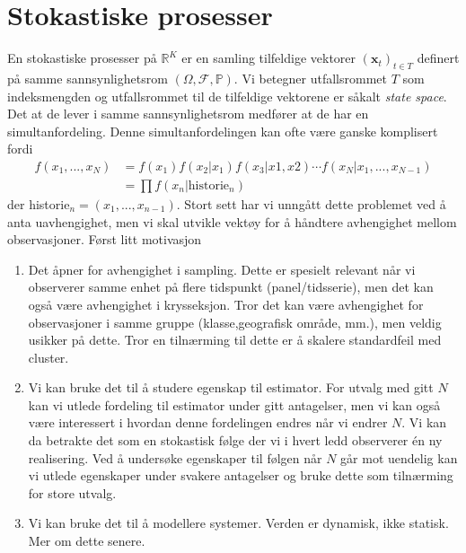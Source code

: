 \chapter{Stokastiske prosesser}
En stokastiske prosesser på $\mathbb{R}^K$ er en samling tilfeldige vektorer $(\mathbf{x}_t)_{t\in T}$ definert på samme sannsynlighetsrom $(\Omega,\mathscr{F},\mathbb{P})$. Vi betegner utfallsrommet $T$  som indeksmengden og utfallsrommet til de tilfeldige vektorene er såkalt \textit{state space}. Det at de lever i samme sannsynlighetsrom medfører at de har en simultanfordeling. Denne simultanfordelingen kan ofte være ganske komplisert fordi
\begin{align}
f(x_1,...,x_N) &= f(x_1)f(x_2|x_1)f(x_3|x1,x2)\cdots f(x_N|x_1,...,x_{N-1}) \\
&= \prod f(x_n|\text{historie}_n)
\end{align}
der historie$_n = (x_1,...,x_{n-1})$. Stort sett har vi unngått dette problemet ved å anta uavhengighet, men vi skal utvikle vektøy for å håndtere avhengighet mellom observasjoner. Først litt motivasjon
\begin{enumerate}
\item Det åpner for avhengighet i sampling. Dette er spesielt relevant når vi observerer samme enhet på flere tidspunkt (panel/tidsserie), men det kan også være avhengighet i krysseksjon. Tror det kan være avhengighet for observasjoner i samme gruppe (klasse,geografisk område, mm.), men veldig usikker på dette. Tror en tilnærming til dette er å skalere standardfeil med cluster.
\item Vi kan bruke det til å studere egenskap til estimator. For utvalg med gitt $N$ kan vi utlede fordeling til estimator under gitt antagelser, men vi kan også være interessert i hvordan denne fordelingen endres når vi endrer $N$. Vi kan da betrakte det som en stokastisk følge der vi i hvert ledd observerer én ny realisering. Ved å undersøke egenskaper til følgen når $N$ går mot uendelig kan vi utlede egenskaper under svakere antagelser og bruke dette som tilnærming for store utvalg.
\item Vi kan bruke det til å modellere systemer. Verden er dynamisk, ikke statisk. Mer om dette senere.
\end{enumerate}
